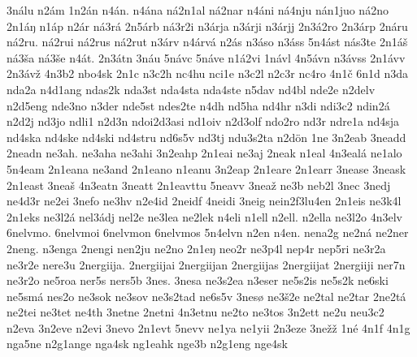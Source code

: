 {    3nálu
    n2ám
    1n2án
    n4án.
    n4ána
    ná2n1al
    ná2nar
    n4áni
    ná4nju
    nán1juo
    ná2no
    2n1áŋ
    n1áp
    n2ár
    ná3rá
    2n5árb
    ná3r2i
    n3árja
    n3árji
    n3árjj
    2n3á2ro
    2n3árp
    2náru
    ná2ru.
    ná2rui
    ná2rus
    ná2rut
    n3árv
    n4árvá
    n2ás
    n3áso
    n3áss
    5n4ást
    nás3te
    2n1áš
    ná3ša
    ná3še
    n4át.
    2n3átn
    3náu
    5návc
    5náve
    n1á2vi
    1návl
    4n5ávn
    n3ávss
    2n1ávv
    2n3ávž
    4n3b2
    nbo4sk
    2n1c
    n3c2h
    nc4hu
    nci1e
    n3c2l
    n2c3r
    nc4ro
    4n1č
    6n1d
    n3da
    nda2a
    n4d1ang
    ndas2k
    nda3st
    nda4sta
    nda4ste
    n5dav
    nd4bl
    nde2e
    n2delv
    n2d5eng
    nde3no
    n3der
    nde5st
    ndes2te
    n4dh
    nd5ha
    nd4hr
    n3di
    ndi3c2
    ndin2á
    n2d2j
    nd3jo
    ndli1
    n2d3n
    ndoi2d3asi
    nd1oiv
    n2d3olf
    ndo2ro
    nd3r
    ndre1a
    nd4sja
    nd4ska
    nd4ske
    nd4ski
    nd4stru
    nd6s5v
    nd3tj
    ndu3s2ta
    n2dön
    1ne
    3n2eab
    3neadd
    2neadn
    ne3ah.
    ne3aha
    ne3ahi
    3n2eahp
    2n1eai
    ne3aj
    2neak
    n1eal
    4n3ealá
    ne1alo
    5n4eam
    2n1eana
    ne3and
    2n1eano
    n1eanu
    3n2eap
    2n1eare
    2n1earr
    3nease
    3neask
    2n1east
    3neaš
    4n3eatn
    3neatt
    2n1eavttu
    5neavv
    3neaž
    ne3b
    neb2l
    3nec
    3nedj
    ne4d3r
    ne2ei
    3nefo
    ne3hv
    n2e4id
    2neidf
    4neidi
    3neig
    nein2f3lu4en
    2n1eis
    ne3k4l
    2n1eks
    ne3l2á
    nel3ádj
    nel2e
    ne3lea
    ne2lek
    n4eli
    n1ell
    n2ell.
    n2ella
    ne3l2o
    4n3elv
    6nelvmo.
    6nelvmoi
    6nelvmon
    6nelvmos
    5n4elvn
    n2en
    n4en.
    nena2g
    ne2ná
    ne2ner
    2neng.
    n3enga
    2nengi
    nen2ju
    ne2no
    2n1eŋ
    neo2r
    ne3p4l
    nep4r
    nep5ri
    ne3r2a
    ne3r2e
    nere3u
    2nergiija.
    2nergiijai
    2nergiijan
    2nergiijas
    2nergiijat
    2nergiiji
    ner7n
    ne3r2o
    ne5roa
    ner5s
    ners5b
    3nes.
    3nesa
    ne3s2ea
    n3eser
    ne5s2is
    ne5s2k
    ne6ski
    ne5smá
    nes2o
    ne3sok
    ne3sov
    ne3s2tad
    ne6s5v
    3nesø
    ne3š2e
    ne2tal
    ne2tar
    2ne2tá
    ne2tei
    ne3tet
    ne4th
    3netne
    2netni
    4n3etnu
    ne2to
    ne3tos
    3n2ett
    ne2u
    neu3c2
    n2eva
    3n2eve
    n2evi
    3nevo
    2n1evt
    5nevv
    ne1ya
    ne1yii
    2n3eze
    3nežž
    1né
    4n1f
    4n1g
    nga5ne
    n2g1ange
    nga4sk
    ng1eahk
    nge3b
    n2g1eng
    nge4sk
}

